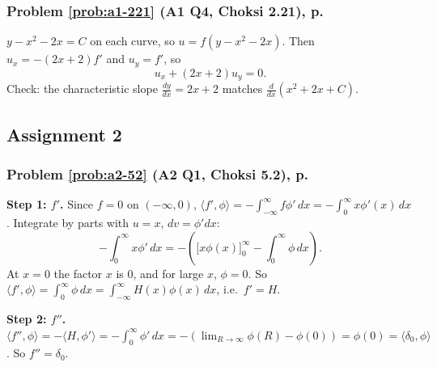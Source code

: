 \documentclass{article}
\newcommand{\ip}[2]{\langle #1, #2 \rangle}
\begin{document}
\label{sol:a1-221}
\subsubsection*{Problem \ref{prob:a1-221} (A1 Q4, Choksi 2.21), p.~\pageref{prob:a1-221}}
$y - x^2 - 2x = C$ on each curve, so $u = f(y - x^2 - 2x)$. Then $u_x = -(2x+2)f'$ and $u_y = f'$, so
\begin{equation*}
    u_x + (2x+2)u_y = 0.
\end{equation*}
Check: the characteristic slope $\frac{dy}{dx} = 2x + 2$ matches $\frac{d}{dx}(x^2 + 2x + C)$.

\subsection{Assignment 2}

\label{sol:a2-52}
\subsubsection*{Problem \ref{prob:a2-52} (A2 Q1, Choksi 5.2), p.~\pageref{prob:a2-52}}
\textbf{Step 1: $f'$.} Since $f = 0$ on $(-\infty,0)$, $\ip{f'}{\phi} = -\int_{-\infty}^\infty f\phi'\,dx = -\int_0^\infty x\phi'(x)\,dx$. Integrate by parts with $u = x$, $dv = \phi'dx$:
\begin{equation*}
    -\int_0^\infty x\phi'\,dx = -\left(\big[x\phi(x)\big]_0^\infty - \int_0^\infty\phi\,dx\right).
\end{equation*}
At $x = 0$ the factor $x$ is $0$, and for large $x$, $\phi = 0$. So $\ip{f'}{\phi} = \int_0^\infty\phi\,dx = \int_{-\infty}^\infty H(x)\phi(x)\,dx$, i.e.\ $f' = H$.\par
\textbf{Step 2: $f''$.} $\ip{f''}{\phi} = -\ip{H}{\phi'} = -\int_0^\infty\phi'\,dx = -\left(\lim_{R\to\infty}\phi(R) - \phi(0)\right) = \phi(0) = \ip{\delta_0}{\phi}$. So $f'' = \delta_0$.

\label{sol:a2-53}
\end{document}
